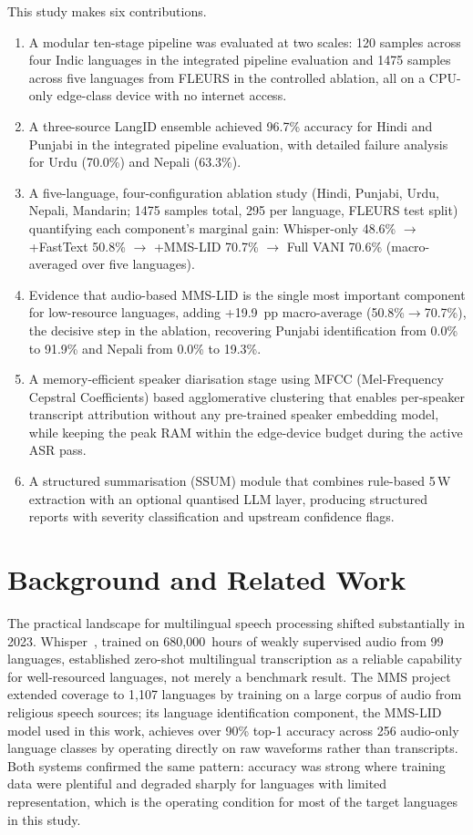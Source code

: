 \documentclass[conference]{IEEEtran}
\begin{document}
This study makes six contributions.
\begin{enumerate}
\item A modular ten-stage pipeline was evaluated at two scales: 120 samples across four Indic languages in the integrated pipeline evaluation and 1475 samples across five languages from FLEURS in the controlled ablation, all on a CPU-only edge-class device with no internet access.
\item A three-source LangID ensemble achieved 96.7\% accuracy for Hindi and Punjabi in the integrated pipeline evaluation, with detailed failure analysis for Urdu (70.0\%) and Nepali (63.3\%).
\item A five-language, four-configuration ablation study (Hindi, Punjabi, Urdu, Nepali, Mandarin; 1475 samples total, 295 per language, FLEURS test split) quantifying each component's marginal gain: Whisper-only 48.6\% $\rightarrow$ +FastText 50.8\% $\rightarrow$ +MMS-LID 70.7\% $\rightarrow$ Full VANI 70.6\% (macro-averaged over five languages).
\item Evidence that audio-based MMS-LID is the single most important component for low-resource languages, adding +19.9~pp macro-average (50.8\%$\rightarrow$70.7\%), the decisive step in the ablation, recovering Punjabi identification from 0.0\% to 91.9\% and Nepali from 0.0\% to 19.3\%.
\item A memory-efficient speaker diarisation stage using MFCC (Mel-Frequency Cepstral Coefficients) based agglomerative clustering that enables per-speaker transcript attribution without any pre-trained speaker embedding model, while keeping the peak RAM within the edge-device budget during the active ASR pass.
\item A structured summarisation (SSUM) module that combines rule-based 5\,W extraction with an optional quantised LLM layer, producing structured reports with severity classification and upstream confidence flags.
\end{enumerate}

\section{Background and Related Work}

The practical landscape for multilingual speech processing shifted substantially in 2023. Whisper~\cite{radford2022whisper}, trained on 680,000~hours of weakly supervised audio from 99 languages, established zero-shot multilingual transcription as a reliable capability for well-resourced languages, not merely a benchmark result. The MMS project~\cite{pratap2023scaling} extended coverage to 1,107 languages by training on a large corpus of audio from religious speech sources; its language identification component, the MMS-LID model used in this work, achieves over 90\% top-1 accuracy across 256 audio-only language classes by operating directly on raw waveforms rather than transcripts. Both systems confirmed the same pattern: accuracy was strong where training data were plentiful and degraded sharply for languages with limited representation, which is the operating condition for most of the target languages in this study.
\end{document}
